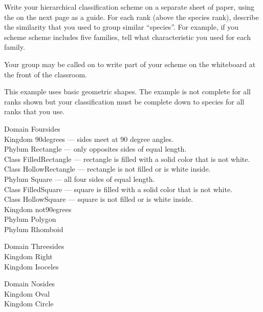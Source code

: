 \documentclass[12pt]{exam}
\newlength{\myindent}
\newcommand{\ind}{\hspace*{\myindent}}
\begin{document}
\begin{questions}

\question
Write your hierarchical classification scheme on a separate sheet of paper, using the on the next page as a guide. For each rank (above the species rank), describe the similarity that you used to group similar “species”. For example, if you scheme scheme includes five families, tell what characteristic you used for each family.


Your group may be called on to write part of your scheme on the whiteboard at the front of the classroom.

\end{questions}

\newpage

This example uses basic geometric shapes. The example is not complete for all ranks shown but your classification must be complete down to species for all ranks that you use. \bigskip

Domain Foursides\\
	\ind Kingdom 90degrees — sides meet at 90 degree angles.\\
	\ind	\ind Phylum Rectangle — only opposites sides of equal length.\\
	\ind	\ind	\ind Class FilledRectangle — rectangle is filled with a solid color that is not white.\\
	\ind	\ind	\ind Class HollowRectangle  — rectangle is not filled or is white inside. \\
	\ind	\ind Phylum Square — all four sides of equal length.\\
	\ind	\ind	\ind Class FilledSquare — square is filled with a solid color that is not white.\\ 
	\ind	\ind	\ind Class HollowSquare — square is not filled or is white inside. \\
	\ind Kingdom not90egrees\\
	\ind	\ind Phylum Polygon\\
	\ind	\ind Phylum Rhomboid
	
	\medskip
	
Domain Threesides\\
	\ind Kingdom Right\\
	\ind Kingdom Isoceles
	
	\medskip
	
Domain Nosides\\
	\ind Kingdom Oval\\
	\ind Kingdom Circle\\
\end{document}
